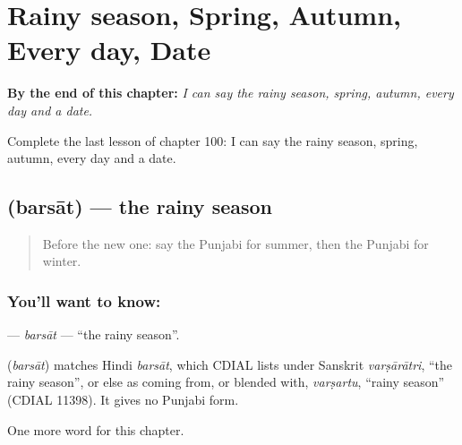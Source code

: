 
\chapter{Rainy season, Spring, Autumn, Every day, Date}
\label{ch:pa-rainy-season-spring-autumn-every-day-date}

\begin{chapteropening}
\textbf{By the end of this chapter:} \emph{I can say the rainy season, spring, autumn, every day and a date.}

Complete the last lesson of chapter 100: I can say the rainy season, spring, autumn, every day and a date.
\end{chapteropening}

\section[\texorpdfstring{\pa{ਬਰਸਾਤ} (barsāt)}{ਬਰਸਾਤ (barsāt)}]{ (barsāt) — the rainy season}

\label{lesson:PA-C100-barsat}



\begin{quote}
Before the new one: say the Punjabi for summer, then the Punjabi for winter.
\end{quote}

\subsection*{You'll want to know: }
\textbf{} — \emph{barsāt} — \textquotedblleft{}the rainy season\textquotedblright{}.

\begin{cousinweb}
\textbf{} (\emph{barsāt}) matches Hindi \emph{barsāt}, which CDIAL lists under Sanskrit \emph{varṣārātri}, \textquotedblleft{}the rainy season\textquotedblright{}, or else as coming from, or blended with, \emph{varṣartu}, \textquotedblleft{}rainy season\textquotedblright{} (CDIAL 11398). It gives no Punjabi form.
\end{cousinweb}

\begin{grammarlens}[title={What you've built}]
One more word for this chapter.
\end{grammarlens}

